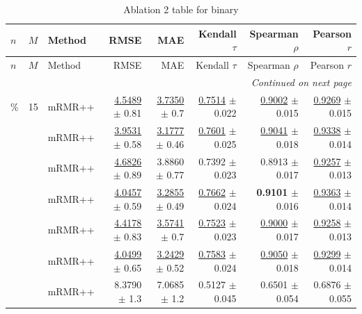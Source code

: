 \footnotesize
\setlength{\tabcolsep}{2pt}
\renewcommand{\arraystretch}{1.05}
\setlength{\LTpre}{0pt}
\setlength{\LTpost}{0pt}
\setlength{\LTleft}{\fill}
\setlength{\LTright}{\fill}
\begin{longtable}{llp{}rrrrr}
\caption{Ablation 2 table for binary}\label{tab:ablation\_2\_binary}\\
\toprule
$n$ & $M$ & Method & RMSE & MAE & Kendall $\tau$ & Spearman $\rho$ & Pearson $r$ \\
\midrule
\endfirsthead
\toprule
$n$ & $M$ & Method & RMSE & MAE & Kendall $\tau$ & Spearman $\rho$ & Pearson $r$ \\
\midrule
\endhead
\midrule
\multicolumn{8}{r}{\emph{Continued on next page}} \\
\midrule
\endfoot
\bottomrule
\endlastfoot
5\% & 15 & mRMR++ & \underline{4.5489} {\scriptsize $\pm$ 0.81} & \underline{3.7350} {\scriptsize $\pm$ 0.7} & \underline{0.7514} {\scriptsize $\pm$ 0.022} & \underline{0.9002} {\scriptsize $\pm$ 0.015} & \underline{0.9269} {\scriptsize $\pm$ 0.015} \\
 &  & mRMR++ & \underline{3.9531} {\scriptsize $\pm$ 0.58} & \underline{3.1777} {\scriptsize $\pm$ 0.46} & \underline{0.7601} {\scriptsize $\pm$ 0.025} & \underline{0.9041} {\scriptsize $\pm$ 0.018} & \underline{0.9338} {\scriptsize $\pm$ 0.014} \\
 &  & mRMR++ & \underline{4.6826} {\scriptsize $\pm$ 0.89} & 3.8860 {\scriptsize $\pm$ 0.77} & 0.7392 {\scriptsize $\pm$ 0.023} & 0.8913 {\scriptsize $\pm$ 0.017} & \underline{0.9257} {\scriptsize $\pm$ 0.013} \\
 &  & mRMR++ & \underline{4.0457} {\scriptsize $\pm$ 0.59} & \underline{3.2855} {\scriptsize $\pm$ 0.49} & \underline{0.7662} {\scriptsize $\pm$ 0.024} & \textbf{0.9101} {\scriptsize $\pm$ 0.016} & \underline{0.9363} {\scriptsize $\pm$ 0.014} \\
 &  & mRMR++ & \underline{4.4178} {\scriptsize $\pm$ 0.83} & \underline{3.5741} {\scriptsize $\pm$ 0.7} & \underline{0.7523} {\scriptsize $\pm$ 0.023} & \underline{0.9000} {\scriptsize $\pm$ 0.017} & \underline{0.9258} {\scriptsize $\pm$ 0.013} \\
 &  & mRMR++ & \underline{4.0499} {\scriptsize $\pm$ 0.65} & \underline{3.2429} {\scriptsize $\pm$ 0.52} & \underline{0.7583} {\scriptsize $\pm$ 0.024} & \underline{0.9050} {\scriptsize $\pm$ 0.018} & \underline{0.9299} {\scriptsize $\pm$ 0.014} \\
 &  & mRMR++ & 8.3790 {\scriptsize $\pm$ 1.3} & 7.0685 {\scriptsize $\pm$ 1.2} & 0.5127 {\scriptsize $\pm$ 0.045} & 0.6501 {\scriptsize $\pm$ 0.054} & 0.6876 {\scriptsize $\pm$ 0.055} \\

\end{longtable}
